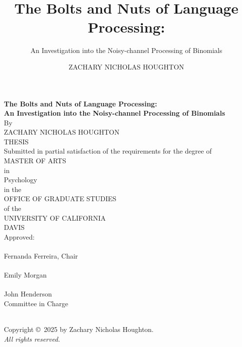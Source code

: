 \documentclass[
  12pt,
]{scrartcl}
\title{The Bolts and Nuts of Language Processing:}
\subtitle{An Investigation into the Noisy-channel Processing of
Binomials}
\author{ZACHARY NICHOLAS HOUGHTON}
\date{}
\begin{document}
\cleardoublepage
\thispagestyle{plain}
\begin{center}
   \null\vfill
   \textbf{%
      The Bolts and Nuts of Language Processing:\\
	  An Investigation into the Noisy-channel Processing of Binomials
   }%
   \\
   \bigskip
   By \\
   \bigskip
   {ZACHARY NICHOLAS HOUGHTON}
\\   
   THESIS \\
   \bigskip
   Submitted in partial satisfaction of the requirements for the
   degree of \\
   \bigskip
   MASTER OF ARTS \\
   \bigskip
   in \\
   \bigskip
   {Psychology} \\ 
      \bigskip
   in the \\
   \bigskip
   OFFICE OF GRADUATE STUDIES \\
   \bigskip        
   of the \\
   \bigskip
   UNIVERSITY OF CALIFORNIA \\
   \bigskip
   DAVIS \\
   \bigskip
   Approved: \\
   \bigskip
   \bigskip
   \makebox[3in]{\hrulefill} \\
   Fernanda Ferreira, Chair \\
   \bigskip
   \bigskip
   \makebox[3in]{\hrulefill} \\
   Emily Morgan \\
   \bigskip
   \bigskip
   \makebox[3in]{\hrulefill} \\
   John Henderson \\
   \bigskip
   Committee in Charge \\
    \\
   \vfill
\end{center}


\newpage
{}
\setcounter{savedpage}{\value{page}}

\thispagestyle{empty}
\begin{titlepage}
\begin{center}
  Copyright \copyright\ 2025 by Zachary Nicholas Houghton. \\
  \textit{All rights reserved.}
\end{center}
\end{titlepage}
\end{document}
